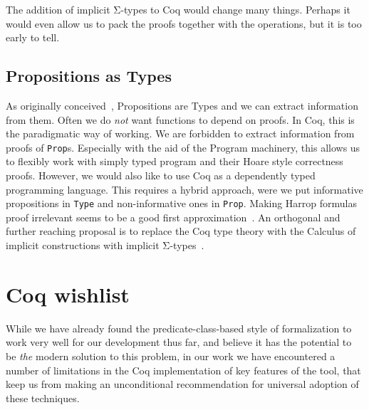 \documentclass[a4paper,10pt,runningheads]{llncs}
\begin{document}
The addition of implicit Σ-types to Coq would change many things. Perhaps it would even allow us
to pack the proofs together with the operations, but it is too early to tell.

\subsection{Propositions as Types}
As originally conceived~\cite{ITT,CMCP}, Propositions are Types and we can extract information from
them. Often we do \emph{not} want functions to depend on proofs. In Coq, this is the paradigmatic way of working. We are forbidden to extract information from proofs of \lstinline|Prop|s. Especially with the aid of the Program machinery, this allows us to flexibly work with simply typed program and their Hoare style correctness proofs. However, we would also like to use Coq as a dependently typed programming language. This requires a hybrid approach, were we put informative propositions in \lstinline|Type| and non-informative ones in \lstinline|Prop|. Making Harrop formulas proof irrelevant seems to be a good first approximation~\cite{lcf:spi:03}. An orthogonal and further reaching proposal is to replace the Coq type theory with the Calculus of implicit constructions with implicit
Σ-types~\cite{miquel2001implicit,barras2008implicit,Bernardo}. 


\section{Coq wishlist}

While we have already found the predicate-class-based style of formalization to work very well for our development thus far, and believe it has the potential to be \emph{the} modern solution to this problem, in our work we have encountered a number of limitations in the Coq implementation of key features of the tool, that keep us from making an unconditional recommendation for universal adoption of these techniques.
\end{document}
